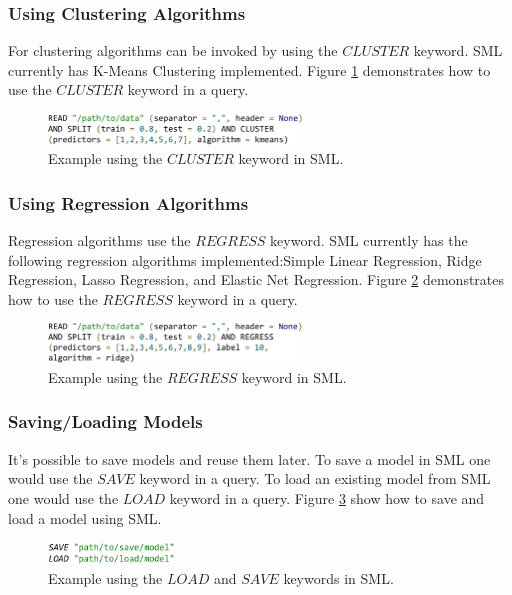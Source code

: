 \documentclass[jair,twoside,11pt,theapa]{article}
\begin{document}
\subsubsection{Using Clustering Algorithms}
For clustering algorithms can be invoked by using the \(CLUSTER\) keyword. SML currently has K-Means Clustering implemented. Figure \ref{fig:SML:CLUSTER} demonstrates how to use the \(CLUSTER\) keyword in a query.

\begin{figure}
\includegraphics[width=0.6\textwidth]{figs/CLUSTER.png}
\centering
\caption{Example using the \(CLUSTER\) keyword in SML.}
\label{fig:SML:CLUSTER}
\end{figure}

\subsubsection{Using Regression Algorithms}
Regression algorithms use the \(REGRESS\) keyword. SML currently has the following regression algorithms implemented:Simple Linear Regression, Ridge Regression, Lasso Regression, and Elastic Net Regression. Figure \ref{fig:SML:REGRESS} demonstrates how to use the \(REGRESS\) keyword in a query.

\begin{figure}
\includegraphics[width=0.6\textwidth]{figs/REGRESS.png}
\centering
\caption{Example using the \(REGRESS\) keyword in SML.}
\label{fig:SML:REGRESS}
\end{figure}

\subsubsection{Saving/Loading Models}
It's possible to save models and reuse them later. To save a model in SML one would use the \(SAVE\) keyword in a query. To load an existing model from SML one would use the \(LOAD\) keyword in a query. Figure \ref{fig:SML:SAVE_LOAD} show how to save and load a model using SML.

\begin{figure}
\includegraphics[width=0.3\textwidth]{figs/SAVE_LOAD.png}
\centering
\caption{Example using the \(LOAD\) and \(SAVE\) keywords in SML.}
\label{fig:SML:SAVE_LOAD}
\end{figure}
\end{document}
